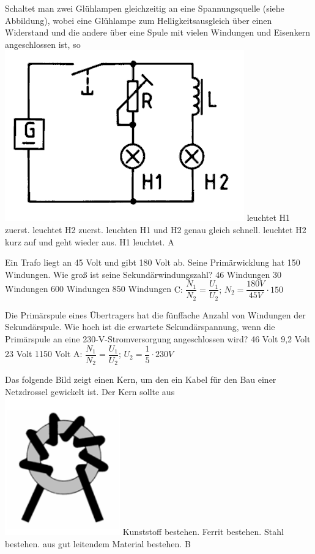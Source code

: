 {Schaltet man zwei Glühlampen gleichzeitig an eine Spannungsquelle (siehe Abbildung), wobei eine Glühlampe zum Helligkeitsausgleich über einen Widerstand und die andere über eine Spule mit vielen Windungen und Eisenkern angeschlossen ist, so\\ \includegraphics[scale=0.35]{Spule/Bilder/TC305.png}}%
{leuchtet H1 zuerst.}%
{leuchtet H2 zuerst.}%
{leuchten H1 und H2 genau gleich schnell.}%
{leuchtet H2 kurz auf und geht wieder aus. H1 leuchtet.}%
{A}%

{Ein Trafo liegt an 45 Volt und gibt 180 Volt ab. Seine Primärwicklung hat 150 Windungen. Wie groß ist seine Sekundärwindungszahl?}%
{46 Windungen}%
{30 Windungen}%
{600 Windungen}%
{850 Windungen}%
{C: $\dfrac{N_1}{N_2} = \dfrac{U_1}{U_2}$; $N_2 = \dfrac{180V}{45V} \cdot 150$}%

{Die Primärspule eines Übertragers hat die fünffache Anzahl von Windungen der Sekundärspule. Wie hoch ist die erwartete Sekundärspannung, wenn die Primärspule an eine 230-V-Stromversorgung angeschlossen wird?}%
{46 Volt}%
{9,2 Volt}%
{23 Volt}%
{1150 Volt}%
{A: $\dfrac{N_1}{N_2} = \dfrac{U_1}{U_2}$; $U_2 = \dfrac{1}{5} \cdot 230V$}%

{Das folgende Bild zeigt einen Kern, um den ein Kabel für den Bau einer Netzdrossel gewickelt ist. Der Kern sollte aus\\ \includegraphics[scale=0.9]{Spule/Bilder/TC304.png}}%
{Kunststoff bestehen.}%
{Ferrit bestehen.}%
{Stahl bestehen.}%
{aus gut leitendem Material bestehen.}%
{B}%

